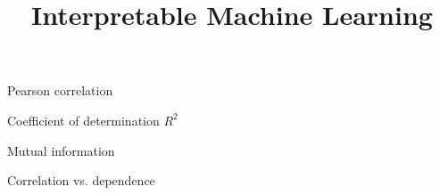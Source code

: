 \documentclass[10pt,compress,t,notes=noshow, xcolor=table]{beamer}
\title{Interpretable Machine Learning}
\date{}
\begin{document}
{
\item Pearson correlation
\item Coefficient of determination $R^2$
\item Mutual information
\item Correlation vs. dependence
}

%
%
%
%
\end{document}
